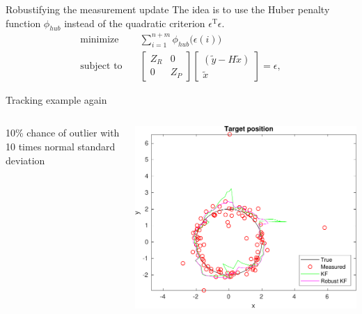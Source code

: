 \documentclass[presentation,aspectratio=169]{beamer}
\renewcommand{\transp}{^{\mathrm{T}}}
\begin{document}
\begin{frame}[label=sec-3-5]{Robustifying the measurement update}
The idea is to use the Huber penalty function $\phi_{hub}$ instead of the quadratic criterion $\epsilon\transp \epsilon$.
\begin{align*}
 \text{minimize} \quad & \sum_{i=1}^{n+m} \phi_{hub}\big( \epsilon(i)\big) \\
\text{subject to} \quad & \begin{bmatrix} Z_R & 0\\0 & Z_P \end{bmatrix} \begin{bmatrix}(\tilde{y}-H\tilde{x})\\ \tilde{x} \end{bmatrix} = \epsilon,
 \end{align*}
\end{frame}


\begin{frame}[label=sec-3-6]{Tracking example again}
\begin{columns}
\begin{column}{0.3\textwidth}
10\% chance of outlier with 10 times normal standard deviation
\end{column}

\begin{column}{0.7\textwidth}
\begin{center}
\includegraphics[width=0.9\linewidth]{circular_movement_rkf}
\end{center}
\end{column}
\end{columns}
\end{frame}
\end{document}
